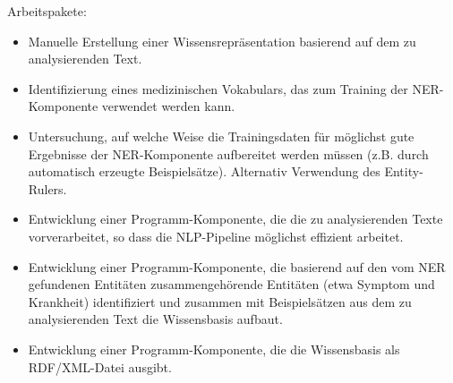 \vspace{1cm}

Arbeitspakete:
\begin{itemize}
    \item Manuelle Erstellung einer Wissensrepräsentation basierend auf dem zu analysierenden Text.
    \item Identifizierung eines medizinischen Vokabulars, das zum Training der NER-Komponente verwendet werden kann.
    \item Untersuchung, auf welche Weise die Trainingsdaten für möglichst gute Ergebnisse der NER-Komponente aufbereitet werden müssen (z.B. durch automatisch erzeugte Beispielsätze). Alternativ Verwendung des Entity-Rulers.
    \item Entwicklung einer Programm-Komponente, die die zu analysierenden Texte vorverarbeitet, so dass die NLP-Pipeline möglichst effizient arbeitet.
    \item Entwicklung einer Programm-Komponente, die basierend auf den vom NER gefundenen Entitäten zusammengehörende Entitäten (etwa Symptom und Krankheit) identifiziert und zusammen mit Beispielsätzen aus dem zu analysierenden Text die Wissensbasis aufbaut.
    \item Entwicklung einer Programm-Komponente, die die Wissensbasis als RDF/XML-Datei ausgibt.
\end{itemize}



